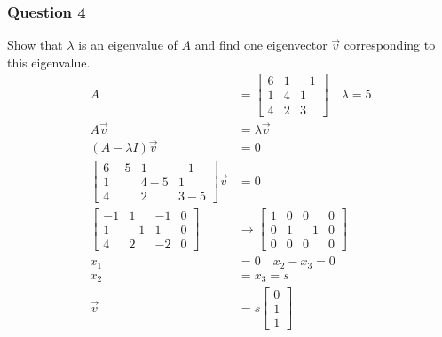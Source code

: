 \documentclass{math}
\begin{document}
\subsubsection*{Question 4}
Show that \( \lambda \) is an eigenvalue of \( A \) and find one eigenvector
\( \vec{v} \) corresponding to this eigenvalue.
\begin{align*}
  A &= \begin{bmatrix}
    6 & 1 & -1 \\
    1 & 4 & 1 \\
    4 & 2 & 3
  \end{bmatrix} \quad \lambda = 5 \\
  A\vec{v} &= \lambda\vec{v} \\
  (A-\lambda I)\vec{v} &= 0 \\
  \begin{bmatrix}
    6-5 & 1 & -1 \\
    1 & 4-5 & 1 \\
    4 & 2 & 3-5
  \end{bmatrix}\vec{v} &= 0 \\
  \begin{bmatrix}
    -1 & 1 & -1 & 0 \\
    1 & -1 & 1 & 0 \\
    4 & 2 & -2 & 0
  \end{bmatrix} &\to \begin{bmatrix}
    1 & 0 & 0 & 0 \\
    0 & 1 & -1 & 0 \\
    0 & 0 & 0 & 0
  \end{bmatrix} \\
  x_1 &= 0 \quad x_2-x_3 = 0 \\
  x_2 &= x_3 = s \\
  \vec{v} &= s\begin{bmatrix}0 \\ 1 \\ 1\end{bmatrix}
\end{align*}
\end{document}
